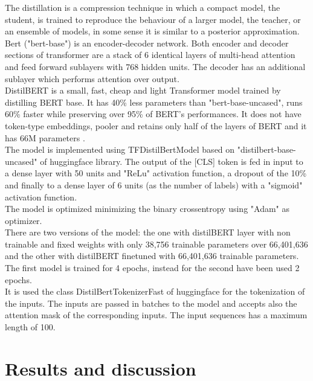 \documentclass[10.5pt]{article}
\begin{document}
\begin{multicols*}{2}
The distillation is a compression technique in which a compact model, the student, is trained to reproduce the behaviour of a larger model, the teacher, or an ensemble of models, in some sense it is similar to a posterior approximation.\\
Bert ("bert-base") is an encoder-decoder network. Both encoder and decoder sections of transformer are a stack of 6 identical layers of multi-head attention and feed forward sublayers with 768 hidden units. The decoder has an additional sublayer which performs attention over output.\\
DistilBERT is a small, fast, cheap and light Transformer model trained by distilling BERT base. It has 40\% less parameters than "bert-base-uncased", runs 60\% faster while preserving over 95\% of BERT’s performances. It does not have token-type embeddings, pooler and retains only half of the layers of BERT and it has 66M parameters \cite{sanh2019distilbert}.\\
The model is implemented using TFDistilBertModel based on "distilbert-base-uncased" of huggingface library. The output of the [CLS] token is fed in input to a dense layer with 50 units and "ReLu" activation function, a dropout of the 10\% and finally to a dense layer of 6 units (as the number of labels) with a "sigmoid" activation function.\\
The model is optimized minimizing the binary crossentropy using "Adam" as optimizer.\\
There are two versions of the model: the one with distilBERT layer with non trainable and fixed weights with only 38,756 trainable parameters over 66,401,636 and the other with distilBERT finetuned with 66,401,636 trainable parameters.\\
The first model is trained for 4 epochs, instead for the second have been used 2 epochs.\\
It is used the class DistilBertTokenizerFast of huggingface for the tokenization of the inputs. The inputs are passed in batches to the model and accepts also the attention mask of the corresponding inputs. The input sequences has a maximum length of 100.

\section{Results and discussion}


\end{multicols*}
\end{document}
